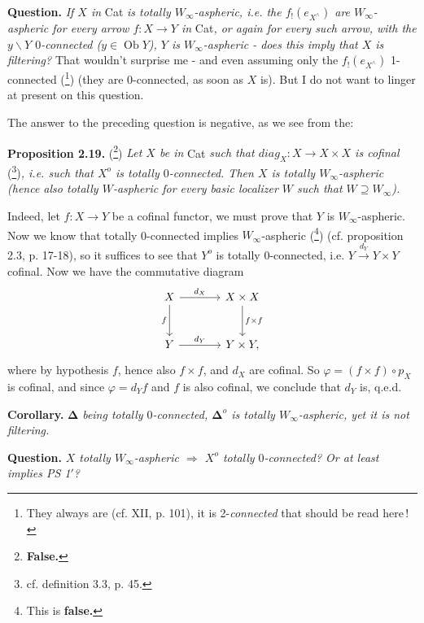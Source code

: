 \documentclass[11pt]{article}
\newcommand{\printedpage}[1]{\marginpar{\footnotesize p.~#1}}
\newcommand{\msp}[1]{\marginpar{\footnotesize [#1]}}
\newcommand{\Ob}{\operatorname{Ob}}
\begin{document}
\msp{page 36}
\noindent\textbf{Question.} \textit{If $X$ in} Cat \textit{is totally $W_\infty$-aspheric, i.e. the $f_!(e_{X^\wedge})$ are $W_\infty$-aspheric for every arrow $f : X \longrightarrow Y$ in} Cat\textit{, or again for every such arrow, with the $y\backslash Y$ $0$-connected ($y \in \Ob Y$), $Y$ is $W_\infty$-aspheric - does this imply that $X$ is filtering?} That wouldn't surprise me - and even assuming only the $f_!(e_{X^\wedge})$ 1-connected (\footnote[42]{They always are (cf. XII, p. 101), it is 2-\textit{connected} that should be read here\,!}) (they are 0-connected, as soon as $X$ is). But I do not want to linger at present on this question.

The answer to the preceding question is negative, as we see from the:

\printedpage{22}

\noindent\textbf{Proposition 2.19.} (\footnote[43]{\textbf{False.}}) \textit{Let $X$ be in} Cat \textit{such that $\mathit{diag}_X : X \longrightarrow X \times X$ is cofinal} (\footnote[44]{cf. definition 3.3, p. 45.})\textit{, i.e. such that $X^o$ is totally $0$-connected. Then $X$ is totally $W_\infty$-aspheric (hence also totally $W$-aspheric for every basic localizer $W$ such that $W \supseteq W_\infty$).}

Indeed, let $f : X \longrightarrow Y$ be a cofinal functor, we must prove that $Y$ is $W_\infty$-aspheric. Now we know that totally 0-connected implies $W_\infty$-aspheric (\footnote[45]{This is \textbf{false.}}) (cf. proposition 2.3, p. 17-18), so it suffices to see that $Y^o$ is totally 0-connected, i.e. $Y \xrightarrow{d_Y} Y \times Y$ cofinal. Now we have the commutative diagram
\[
\begin{tikzcd}[row sep=large, column sep=large]
X \arrow[r, "d_X"] \arrow[d, "f"'] & X \times X \arrow[d, "f \times f"] \\
Y \arrow[r, "d_Y"] & Y \times Y,
\end{tikzcd}
\]
where by hypothesis $f$, hence also $f \times f$, and $d_X$ are cofinal. So $\varphi = (f \times f) \circ p_X$ is cofinal, and since $\varphi = d_Y f$ and $f$ is also cofinal, we conclude that $d_Y$ is, q.e.d.

\noindent\textbf{Corollary.} $\boldsymbol{\Delta}$ \textit{being totally $0$-connected, $\boldsymbol{\Delta}^o$ is totally $W_\infty$-aspheric, yet it is not filtering.}

\noindent\textbf{Question.} \textit{$X$ totally $W_\infty$-aspheric $\Longrightarrow$ $X^o$ totally $0$-connected? Or at least implies PS 1$'$?}
\end{document}
